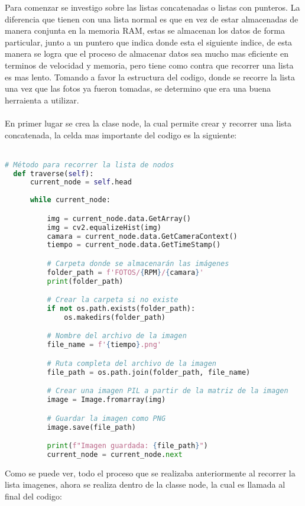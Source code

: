 \documentclass{article}
\begin{document}
\noindent Para comenzar se investigo sobre las listas concatenadas o listas con punteros. La diferencia que tienen con una lista normal es que en vez de estar
almacenadas de manera conjunta en la memoria RAM, estas se almacenan los datos de forma particular, junto a un puntero que indica donde esta el siguiente
indice, de esta manera se logra que el proceso de almacenar datos sea mucho mas eficiente en terminos de velocidad y memoria, pero tiene como contra que recorrer 
una lista es mas lento. Tomando a favor la estructura del codigo, donde se recorre la lista una vez que las fotos ya fueron tomadas, se determino que era una
buena herraienta a utilizar.
\\ \\
En primer lugar se crea la clase node, la cual permite crear y recorrer una lista concatenada, la celda mas importante del 
codigo es la siguiente:
\\ \\
\begin{lstlisting}[language=Python]
  # Método para recorrer la lista de nodos
  def traverse(self):
      current_node = self.head
      
      while current_node:

          img = current_node.data.GetArray()
          img = cv2.equalizeHist(img)
          camara = current_node.data.GetCameraContext()
          tiempo = current_node.data.GetTimeStamp()

          # Carpeta donde se almacenarán las imágenes
          folder_path = f'FOTOS/{RPM}/{camara}'
          print(folder_path)

          # Crear la carpeta si no existe
          if not os.path.exists(folder_path):
              os.makedirs(folder_path)

          # Nombre del archivo de la imagen
          file_name = f'{tiempo}.png'

          # Ruta completa del archivo de la imagen
          file_path = os.path.join(folder_path, file_name)

          # Crear una imagen PIL a partir de la matriz de la imagen
          image = Image.fromarray(img)

          # Guardar la imagen como PNG
          image.save(file_path)

          print(f"Imagen guardada: {file_path}")
          current_node = current_node.next
\end{lstlisting}

Como se puede ver, todo el proceso que se realizaba anteriormente al recorrer la lista imagenes, ahora
se realiza dentro de la classe node, la cual es llamada al final del codigo:
\end{document}
